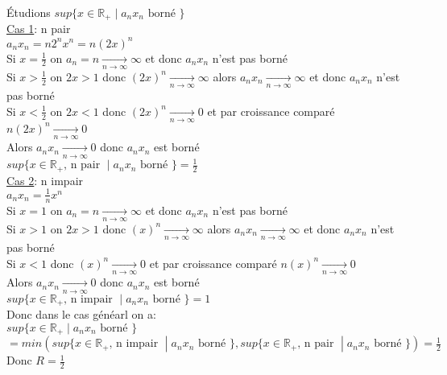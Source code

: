 \documentclass{article}
\newcommand{\mylim}[2]{\underset{#1 \rightarrow #2}{\longrightarrow}}
\begin{document}
\noindent Étudions $sup \{x\in \mathbb{R}_+ \;|\; a_n x_n \mbox{ borné }\}$\\
\underline{Cas 1}: n pair\\
$a_n x_n = n 2^n x^n = n (2x)^n$\\
Si $x = \frac{1}{2}$ on $a_n = n \mylim{n}{\infty} \infty$ et donc $a_n x_n$ n'est pas borné\\
Si $x > \frac{1}{2}$ on $2x > 1$ donc $(2x)^n \mylim{n}{\infty} \infty$ alors $a_n x_n \mylim{n}{\infty} \infty$ et donc $a_n x_n$ n'est pas borné\\
Si $x < \frac{1}{2}$ on $2x < 1$ donc $(2x)^n \mylim{n}{\infty} 0$ et par croissance comparé $n (2x)^n \mylim{n}{\infty} 0$\\
Alors $a_n x_n \mylim{n}{\infty} 0$ donc $a_n x_n$ est borné\\
$sup \{x\in \mathbb{R}_+\mbox{, n pair } \;|\; a_n x_n \mbox{ borné }\} = \frac{1}{2}$\\
\underline{Cas 2}: n impair\\
$a_n x_n = \frac{1}{n} x^n$\\
Si $x = 1$ on $a_n = n \mylim{n}{\infty} \infty$ et donc $a_n x_n$ n'est pas borné\\
Si $x > 1$ on $2x > 1$ donc $(x)^n \mylim{n}{\infty} \infty$ alors $a_n x_n \mylim{n}{\infty} \infty$ et donc $a_n x_n$ n'est pas borné\\
Si $x < 1$ donc $(x)^n \mylim{n}{\infty} 0$ et par croissance comparé $n (x)^n \mylim{n}{\infty} 0$\\
Alors $a_n x_n \mylim{n}{\infty} 0$ donc $a_n x_n$ est borné\\
$sup \{x\in \mathbb{R}_+ \mbox{, n impair } \;|\; a_n x_n \mbox{ borné }\} = 1$\\
Donc dans le cas généarl on a:\\
$sup \{x\in \mathbb{R}_+ \;|\; a_n x_n \mbox{ borné }\}$\\
$= min(sup \{x\in \mathbb{R}_+ \mbox{, n impair } \;|\; a_n x_n \mbox{ borné }\}, sup \{x\in \mathbb{R}_+ \mbox{, n pair } \;|\; a_n x_n \mbox{ borné }\}) = \frac{1}{2}$\\
Donc $R = \frac{1}{2}$
\end{document}
